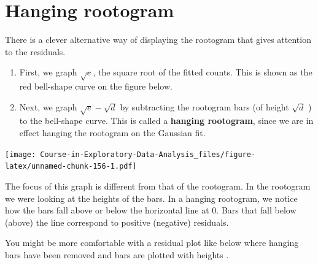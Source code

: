 \documentclass[
]{book}
\newenvironment{Shaded}{\begin{snugshade}}{\end{snugshade}}
\newcommand{\AttributeTok}[1]{\textcolor[rgb]{0.77,0.63,0.00}{#1}}
\newcommand{\FunctionTok}[1]{\textcolor[rgb]{0.00,0.00,0.00}{#1}}
\newcommand{\NormalTok}[1]{#1}
\newcommand{\SpecialCharTok}[1]{\textcolor[rgb]{0.00,0.00,0.00}{#1}}
\newcommand{\StringTok}[1]{\textcolor[rgb]{0.31,0.60,0.02}{#1}}
\begin{document}
\hypertarget{hanging-rootogram}{%
\section{Hanging rootogram}\label{hanging-rootogram}}

There is a clever alternative way of displaying the rootogram that gives attention to the residuals.

\begin{enumerate}
\def\labelenumi{\arabic{enumi}.}
\item
  First, we graph \(\sqrt{e}\), the square root of the fitted counts. This is shown as the red bell-shape curve on the figure below.
\item
  Next, we graph \(\sqrt{e}-\sqrt{d}\) by subtracting the rootogram bars (of height \(\sqrt{d}\) ) to the bell-shape curve. This is called a \textbf{hanging rootogram}, since we are in effect hanging the rootogram on the Gaussian fit.
\end{enumerate}

\begin{Shaded}
\end{Shaded}

\texttt{[image: Course-in-Exploratory-Data-Analysis\_files/figure-latex/unnamed-chunk-156-1.pdf]}

The focus of this graph is different from that of the rootogram. In the rootogram we were looking at the heights of the bars. In a hanging rootogram, we notice how the bars fall above or below the horizontal line at 0. Bars that fall below (above) the line correspond to positive (negative) residuals.

You might be more comfortable with a residual plot like below where hanging bars have been removed and bars are plotted with heights .

\begin{Shaded}
\end{Shaded}
\end{document}
